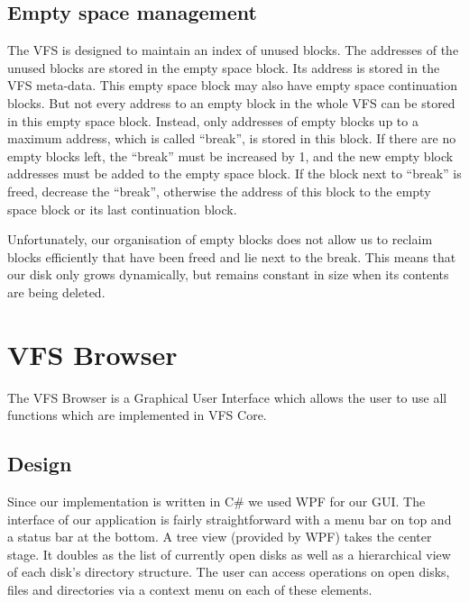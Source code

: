 \documentclass[a4paper,12pt]{article}
\begin{document}
\subsection{Empty space management}\label{sct:empty}

The VFS is designed to maintain an index of unused blocks. The addresses of the unused blocks are stored in the empty space block. Its address is stored in the VFS meta-data. This empty space block may also have empty space continuation blocks. But not every address to an empty block in the whole VFS can be stored in this empty space block. Instead, only addresses of empty blocks up to a maximum address, which is called “break”, is stored in this block. If there are no empty blocks left, the “break” must be increased by 1, and the new empty block addresses must be added to the empty space block. If the block next to “break” is freed, decrease the “break”, otherwise the address of this block to the empty space block or its last continuation block.

Unfortunately, our organisation of empty blocks does not allow us to reclaim blocks efficiently that have been freed and lie next to the break. This means that our disk only grows dynamically, but remains constant in size when its contents are being deleted.


\section{VFS Browser}

The VFS Browser is a Graphical User Interface which allows the user to use all functions which are implemented in VFS Core. 

\subsection{Design}

Since our implementation is written in C\# we used WPF for our GUI. 
The interface of our application is fairly straightforward with a menu bar on top and a status bar at the bottom. A tree view (provided by WPF) takes the center stage. It doubles as the list of currently open disks as well as a hierarchical view of each disk's directory structure. The user can access operations on open disks, files and directories via a context menu on each of these elements.
\end{document}
